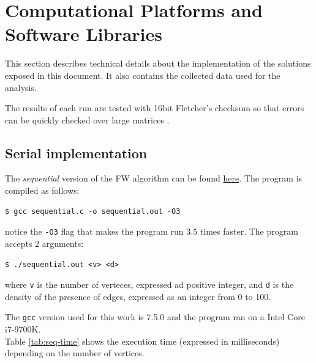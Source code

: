 \section{Computational Platforms and Software Libraries}
This section describes technical details about the implementation of the solutions exposed in this document. It also contains
the collected data used for the analysis.

The results of each run are tested with 16bit Fletcher's checksum so that errors can be quickly checked over large matrices \cite{fletcher}.
\subsection{Serial implementation}
The \emph{sequential} version of the FW algorithm can be found \href{https://github.com/firaja/Parallel-FloydWarshall/blob/master/sequential.c}{here}. 
The program is compiled as follows:
\begin{lstlisting}[basicstyle=\footnotesize\ttfamily]
$ gcc sequential.c -o sequential.out -O3
\end{lstlisting}

notice the \texttt{-O3} flag that makes the program run $3.5$ times faster.
The program accepts 2 arguments:
\begin{lstlisting}[basicstyle=\footnotesize\ttfamily]
$ ./sequential.out <v> <d>
\end{lstlisting}
where \texttt{v} is the number of verteces, expressed ad positive integer, and \texttt{d} is the density of the presence of edges, expressed as an integer from 0 to 100.
\par
The \texttt{gcc} version used for this work is 7.5.0 and the program ran on a Intel Core i7-9700K. \\
Table \ref*{tab:seq-time} shows the execution time (expressed in milliseconds) depending on the number of vertices.



